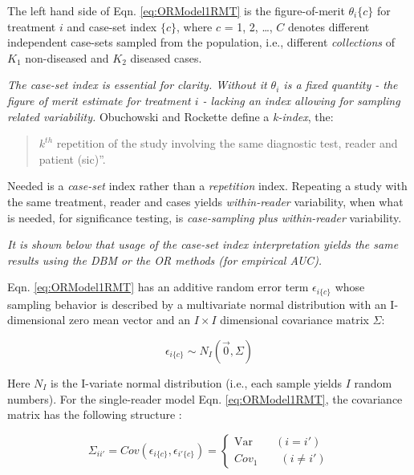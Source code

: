 \documentclass[
]{book}
\begin{document}
The left hand side of Eqn. \eqref{eq:ORModel1RMT} is the figure-of-merit \(\theta_i\{c\}\) for treatment \(i\) and case-set index \(\{c\}\), where \(c\) = 1, 2, \ldots, \(C\) denotes different independent case-sets sampled from the population, i.e., different \emph{collections} of \(K_1\) non-diseased and \(K_2\) diseased cases.

\emph{The case-set index is essential for clarity. Without it \(\theta_i\) is a fixed quantity - the figure of merit estimate for treatment \(i\) - lacking an index allowing for sampling related variability.} Obuchowski and Rockette define a \emph{k-index}, the:

\begin{quote}
\(k^{th}\) repetition of the study involving the same diagnostic test, reader and patient (sic)''.
\end{quote}

Needed is a \emph{case-set} index rather than a \emph{repetition} index. Repeating a study with the same treatment, reader and cases yields \emph{within-reader} variability, when what is needed, for significance testing, is \emph{case-sampling plus within-reader} variability.

\emph{It is shown below that usage of the case-set index interpretation yields the same results using the DBM or the OR methods (for empirical AUC).}

Eqn. \eqref{eq:ORModel1RMT} has an additive random error term \(\epsilon_{i\{c\}}\) whose sampling behavior is described by a multivariate normal distribution with an I-dimensional zero mean vector and an \(I \times I\) dimensional covariance matrix \(\Sigma\):

\begin{equation}
\epsilon_{i\{c\}} \sim N_I\left ( \vec{0} ,  \Sigma\right )
\label{eq:DefinitionEpsilon}
\end{equation}

Here \(N_I\) is the I-variate normal distribution (i.e., each sample yields \(I\) random numbers). For the single-reader model Eqn. \eqref{eq:ORModel1RMT}, the covariance matrix has the following structure :

\begin{equation}
\Sigma_{ii'}=Cov\left ( \epsilon_{i\{c\}}, \epsilon_{i'\{c\}} \right )=\left\{\begin{matrix}
\text{Var} \qquad (i=i')\\ 
Cov_1 \qquad (i\neq i')
\end{matrix}\right.
\label{eq:DefinitionSigma}
\end{equation}
\end{document}
